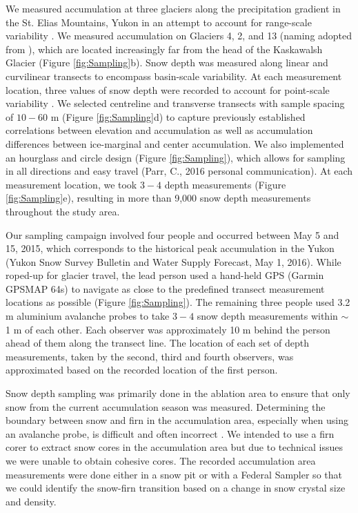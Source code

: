 \documentclass[review,oneside, letterpaper]{igs}
\begin{document}
We measured accumulation at three glaciers along the precipitation gradient in the St. Elias Mountains, Yukon \citep{Taylor1969} in an attempt to account for range-scale variability \citep{Clark2011}. We measured accumulation on Glaciers 4, 2, and 13 (naming adopted from \cite{Crompton2016}), which are located increasingly far from the head of the Kaskawalsh Glacier (Figure \ref{fig:Sampling}b). Snow depth was measured along linear and curvilinear transects to encompass basin-scale variability. At each measurement location, three values of snow depth were recorded to account for point-scale variability \citep{Clark2011}.  We selected centreline and transverse transects with sample spacing of $10-60$ m (Figure \ref{fig:Sampling}d) to capture previously established correlations between elevation and accumulation \citep{Machguth2006, Walmsley2015} as well as accumulation differences between ice-marginal and center accumulation. We also implemented an hourglass and circle design (Figure \ref{fig:Sampling}), which allows for sampling in all directions and easy travel (Parr, C., 2016 personal communication). At each measurement location, we took $3-4$ depth measurements (Figure \ref{fig:Sampling}e), resulting in more than 9,000 snow depth measurements throughout the study area. 

Our sampling campaign involved four people and occurred between May 5 and 15, 2015, which corresponds to the historical peak accumulation in the Yukon (Yukon Snow Survey Bulletin and Water Supply Forecast, May 1, 2016). While roped-up for glacier travel, the lead person used a hand-held GPS (Garmin GPSMAP 64s) to navigate as close to the predefined transect measurement locations as possible (Figure \ref{fig:Sampling}). The remaining three people used 3.2 m aluminium avalanche probes to take $3-4$ snow depth measurements within $\sim$1 m of each other. Each observer was approximately 10 m behind the person ahead of them along the transect line. The location of each set of depth measurements, taken by the second, third and fourth observers, was approximated based on the recorded location of the first person. 

Snow depth sampling was primarily done in the ablation area to ensure that only snow from the current accumulation season was measured. Determining the boundary between snow and firn in the accumulation area, especially when using an avalanche probe, is difficult and often incorrect \citep{Grunewald2010,Sold2013}. We intended to use a firn corer to extract snow cores in the accumulation area but due to technical issues we were unable to obtain cohesive cores. The recorded accumulation area measurements were done either in a snow pit or with a Federal Sampler so that we could identify the snow-firn transition based on a change in snow crystal size and density. 
\end{document}
